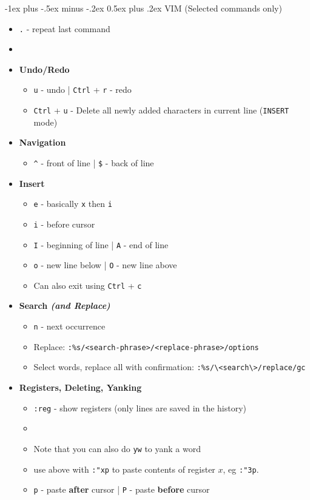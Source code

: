 \documentclass[10pt, landscape]{article}
\makeatletter
\renewcommand{\section}{\@startsection{section}{1}{0mm}%
                                {-1ex plus -.5ex minus -.2ex}%
                                {0.5ex plus .2ex}%
                                {\normalfont\large\bfseries}}
\newcommand{\code}[1]{\textcolor{myblue}{\texttt{#1}}}
\makeatother
\begin{document}
\begin{multicols}{2}
\section{VIM}
(Selected commands only)
\begin{itemize}
    \item[] \code{.} - repeat last command
    \item[]
    \item[] \textbf{Undo/Redo} 
    \begin{itemize}
        \item[] \code{u} - undo | \code{Ctrl} + \code{r} - redo
        \item[] \code{Ctrl} + \code{u} - Delete all newly added characters in current line (\code{INSERT} mode)
    \end{itemize}
    \item[] \textbf{Navigation} 
    \begin{itemize}
        \item[] \code{\^} - front of line | \code{\$} - back of line
    \end{itemize}
    \item[] \textbf{Insert} 
    \begin{itemize}
        \item[] \code{e} - basically \code{x} then \code{i}
        \item[] \code{i} - before cursor
        \item[] \code{I} - beginning of line | \code{A} - end of line
        \item[] \code{o} - new line below | \code{O} - new line above
        \item[] Can also exit using \code{Ctrl} + \code{c}
    \end{itemize}
    \item[] \textbf{Search \textit{(and Replace)}}
    \begin{itemize}
        \item[] \code{n} - next occurrence
        \item[] Replace: \code{:\%s/<search-phrase>/<replace-phrase>/options}
        \item[] Select words, replace all with confirmation: \verb|:%s/\<search\>/replace/gc|
    \end{itemize}
    \item[] \textbf{Registers, Deleting, Yanking}
    \begin{itemize}
        \item[] \code{:reg} - show registers (only lines are saved in the history)
        \item[]
        \item[] Note that you can also do \code{yw} to yank a word
        \item[] use above with \code{:"xp} to paste contents of register $x$, eg \code{:"3p}.
        \item[] \code{p} - paste \textbf{after} cursor | \code{P} - paste \textbf{before} cursor
    \end{itemize}
\end{itemize}


\end{multicols}
\end{document}
